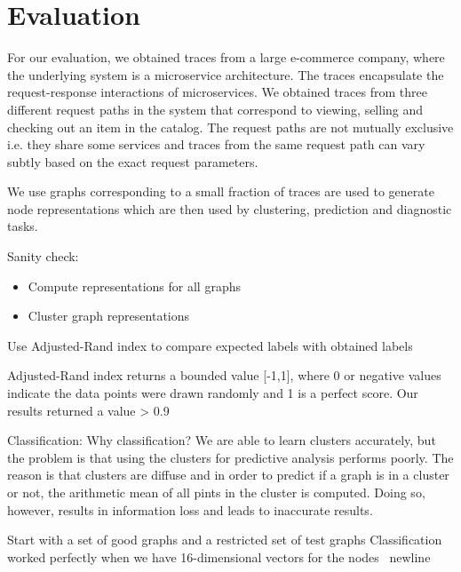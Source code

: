 \section{Evaluation}

For our evaluation, we obtained traces from a large e-commerce company, where the underlying system is a microservice architecture. The traces encapsulate the request-response interactions of microservices. We obtained traces from three different request paths in the system that correspond to viewing, selling and checking out an item in the catalog. The request paths are not mutually exclusive i.e. they share some services and traces from the same request path can vary subtly based on the exact request parameters.

We use graphs corresponding to a small fraction of traces are used to generate node representations which are then used by clustering, prediction and diagnostic tasks. 

Sanity check: 
\begin{itemize}
\item Compute representations for all graphs
\item Cluster graph representations
\end{itemize}
Use Adjusted-Rand index to compare expected labels with obtained labels

Adjusted-Rand index returns a bounded value [-1,1], where 0 or negative values indicate the data points were drawn randomly and 1 is a perfect score. Our results returned a value > 0.9

Classification:
Why classification? 
We are able to learn clusters accurately, but the problem is that using the clusters for predictive analysis performs poorly. The reason is that clusters are diffuse and in order to predict if a graph is in a cluster or not, the arithmetic mean of all pints in the cluster is computed. Doing so, however, results in information loss and leads to inaccurate results.

Start with a set of good graphs and a restricted set of test graphs
Classification worked perfectly when we have 16-dimensional vectors for the nodes \ newline

